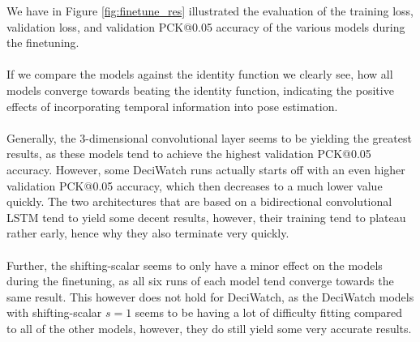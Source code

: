 \documentclass[./main.tex]{subfiles}
\begin{document}
We have in Figure \ref{fig:finetune_res} illustrated the evaluation of the training loss, validation loss, and validation PCK@0.05 accuracy of the various models during the finetuning.
\\
\\
If we compare the models against the identity function we clearly see, how all models converge towards beating the identity function, indicating the positive effects of incorporating temporal information into pose estimation.
\\
\\
Generally, the 3-dimensional convolutional layer seems to be yielding the greatest results, as these models tend to achieve the highest validation PCK@0.05 accuracy. However, some DeciWatch runs actually starts off with an even higher validation PCK@0.05 accuracy, which then decreases to a much lower value quickly. The two architectures that are based on a bidirectional convolutional LSTM tend to yield some decent results, however, their training tend to plateau rather early, hence why they also terminate very quickly. 
\\
\\
Further, the shifting-scalar seems to only have a minor effect on the models during the finetuning, as all six runs of each model tend converge towards the same result. This however does not hold for DeciWatch, as the DeciWatch models with shifting-scalar $s = 1$ seems to be having a lot of difficulty fitting compared to all of the other models, however, they do still yield some very accurate results.
\end{document}
